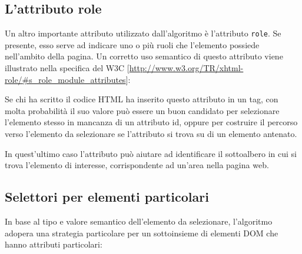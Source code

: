 \documentclass[12pt]{toptesi}
\begin{document}
\subsection {L'attributo role}

Un altro importante attributo utilizzato dall'algoritmo è l'attributo \verb|role|. Se presente, esso serve ad indicare uno o più ruoli che l'elemento possiede nell'ambito della pagina. Un corretto uso semantico di questo attributo viene illustrato nella specifica del W3C [\url{http://www.w3.org/TR/xhtml-role/#s_role_module_attributes}]:



Se chi ha scritto il codice HTML ha inserito questo attributo in un tag, con molta probabilità il suo valore può essere un buon candidato per selezionare l'elemento stesso in mancanza di un attributo id, oppure per costruire il percorso verso l'elemento da selezionare se l'attributo si trova su di un elemento antenato. 

In quest'ultimo caso l'attributo può aiutare ad identificare il sottoalbero in cui si trova l'elemento di interesse, corrispondente ad un'area nella pagina web.

\subsection {Selettori per elementi particolari}

In base al tipo e valore semantico dell'elemento da selezionare, l'algoritmo adopera una strategia particolare per un sottoinsieme di elementi DOM che hanno attributi particolari:
\end{document}
